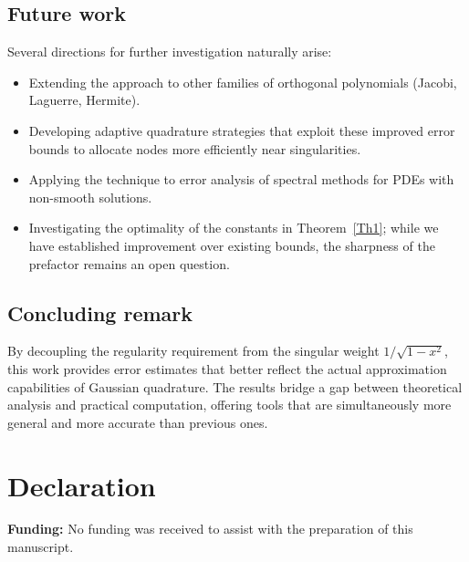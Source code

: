 \documentclass[12pt,a4paper]{article}
\begin{document}
\subsection*{Future work}
Several directions for further investigation naturally arise:
\begin{itemize}
    \item Extending the approach to other families of orthogonal polynomials (Jacobi, Laguerre, Hermite).
    \item Developing adaptive quadrature strategies that exploit these improved error bounds to allocate nodes more efficiently near singularities.
    \item Applying the technique to error analysis of spectral methods for PDEs with non-smooth solutions.
    \item Investigating the optimality of the constants in Theorem~\ref{Th1}; while we have established improvement over existing bounds, the sharpness of the prefactor remains an open question.
\end{itemize}

\subsection*{Concluding remark}
By decoupling the regularity requirement from the singular weight $1/\sqrt{1-x^2}$, this work provides error estimates that better reflect the actual approximation capabilities of Gaussian quadrature. The results bridge a gap between theoretical analysis and practical computation, offering tools that are simultaneously more general and more accurate than previous ones.

\section*{Declaration}
\textbf{Funding:} No funding was received to assist with the preparation of this manuscript.
\end{document}
